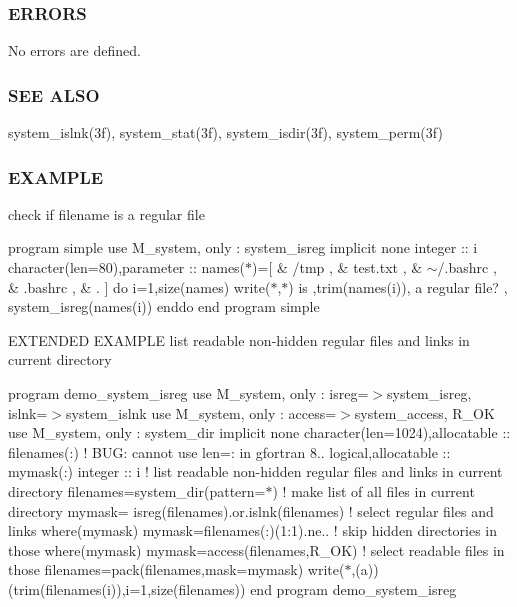 \subsubsection*{E\+R\+R\+O\+RS}

No errors are defined.

\subsubsection*{S\+EE A\+L\+SO}

system\+\_\+islnk(3f), system\+\_\+stat(3f), system\+\_\+isdir(3f), system\+\_\+perm(3f)

\subsubsection*{E\+X\+A\+M\+P\+LE}

check if filename is a regular file

program simple use M\+\_\+system, only \+: system\+\_\+isreg implicit none integer \+:\+: i character(len=80),parameter \+:\+: names($\ast$)=\mbox{[} \& \textquotesingle{}/tmp \textquotesingle{}, \& \textquotesingle{}test.\+txt \textquotesingle{}, \& \textquotesingle{}$\sim$/.bashrc \textquotesingle{}, \& \textquotesingle{}.bashrc \textquotesingle{}, \& \textquotesingle{}. \textquotesingle{}\mbox{]} do i=1,size(names) write($\ast$,$\ast$)\textquotesingle{} is \textquotesingle{},trim(names(i)),\textquotesingle{} a regular file? \textquotesingle{}, system\+\_\+isreg(names(i)) enddo end program simple

E\+X\+T\+E\+N\+D\+ED E\+X\+A\+M\+P\+LE list readable non-\/hidden regular files and links in current directory

program demo\+\_\+system\+\_\+isreg use M\+\_\+system, only \+: isreg=$>$system\+\_\+isreg, islnk=$>$system\+\_\+islnk use M\+\_\+system, only \+: access=$>$system\+\_\+access, R\+\_\+\+OK use M\+\_\+system, only \+: system\+\_\+dir implicit none character(len=1024),allocatable \+:\+: filenames(\+:) ! B\+UG\+: cannot use len=\+: in gfortran 8.. logical,allocatable \+:\+: mymask(\+:) integer \+:\+: i ! list readable non-\/hidden regular files and links in current directory filenames=system\+\_\+dir(pattern=\textquotesingle{}$\ast$\textquotesingle{}) ! make list of all files in current directory mymask= isreg(filenames).or.\+islnk(filenames) ! select regular files and links where(mymask) mymask=filenames(\+:)(1\+:1).ne.\textquotesingle{}.\textquotesingle{} ! skip hidden directories in those where(mymask) mymask=access(filenames,\+R\+\_\+\+O\+K) ! select readable files in those filenames=pack(filenames,mask=mymask) write($\ast$,\textquotesingle{}(a)\textquotesingle{})(trim(filenames(i)),i=1,size(filenames)) end program demo\+\_\+system\+\_\+isreg 

